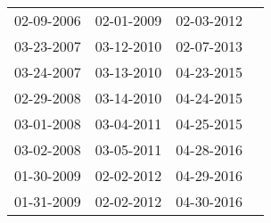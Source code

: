 \begin{supertabular}{llll}
 02-09-2006 &  02-01-2009 &  02-03-2012 \\
 03-23-2007 &  03-12-2010 &  02-07-2013 \\
 03-24-2007 &  03-13-2010 &  04-23-2015 \\
 02-29-2008 &  03-14-2010 &  04-24-2015 \\
 03-01-2008 &  03-04-2011 &  04-25-2015 \\
 03-02-2008 &  03-05-2011 &  04-28-2016 \\
 01-30-2009 &  02-02-2012 &  04-29-2016 \\
 01-31-2009 &  02-02-2012 &  04-30-2016 \\
\end{supertabular}
